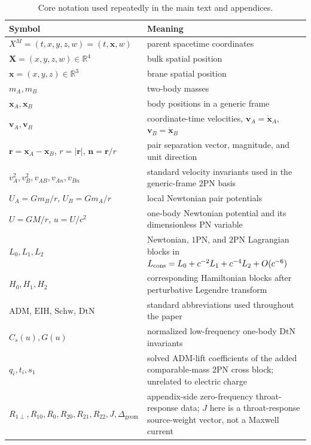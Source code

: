 \documentclass[11pt]{article}
\newcommand{\R}{\mathbb R}
\newcommand{\X}{\mathbf X}
\newcommand{\x}{\mathbf x}
\newcommand{\vct}{\mathbf v}
\newcommand{\nvec}{\mathbf n}
\newcommand{\OnePN}{\mathrm{1PN}}
\newcommand{\TwoPN}{\mathrm{2PN}}
\newcommand{\ADM}{\mathrm{ADM}}
\newcommand{\DtN}{\mathrm{DtN}}
\newcommand{\EIH}{\mathrm{EIH}}
\newcommand{\Schw}{\mathrm{Schw}}
\newcommand{\geom}{\mathrm{geom}}
\begin{document}
\begin{table}[H]
  \centering
  \caption{Core notation used repeatedly in the main text and appendices.}
  \label{tab:notation-core-2pn}
  \small
  \renewcommand{\arraystretch}{1.15}
  \begin{tabularx}{\linewidth}{@{}L L@{}}
    \toprule
    Symbol & Meaning \\
    \midrule
    \(X^M=(t,x,y,z,w)=(t,\x,w)\) & parent spacetime coordinates \\
    \(\X=(x,y,z,w)\in\R^4\) & bulk spatial position \\
    \(\x=(x,y,z)\in\R^3\) & brane spatial position \\
    \(m_A,m_B\) & two-body masses \\
    \(\mathbf x_A,\mathbf x_B\) & body positions in a generic frame \\
    \(\vct_A,\vct_B\) & coordinate-time velocities, \(\vct_A=\dot{\mathbf x}_A\), \(\vct_B=\dot{\mathbf x}_B\) \\
    \(\mathbf r=\mathbf x_A-\mathbf x_B\), \(r=|\mathbf r|\), \(\nvec=\mathbf r/r\) & pair separation vector, magnitude, and unit direction \\
    \(v_A^2, v_B^2, v_{AB}, v_{An}, v_{Bn}\) & standard velocity invariants used in the generic-frame \(\TwoPN\) basis \\
    \(U_A=Gm_B/r\), \(U_B=Gm_A/r\) & local Newtonian pair potentials \\
    \(U=GM/r\), \(u=U/c^2\) & one-body Newtonian potential and its dimensionless PN variable \\
    \(L_0,L_1,L_2\) & Newtonian, \(\OnePN\), and \(\TwoPN\) Lagrangian blocks in
    \(L_{\rm cons}=L_0+c^{-2}L_1+c^{-4}L_2+O(c^{-6})\) \\
    \(H_0,H_1,H_2\) & corresponding Hamiltonian blocks after perturbative Legendre transform \\
    \(\ADM\), \(\EIH\), \(\Schw\), \(\DtN\) & standard abbreviations used throughout the paper \\
    \(C_s(u),G(u)\) & normalized low-frequency one-body \(\DtN\) invariants \\
    \(q_i,t_i,s_1\) & solved \(\ADM\)-lift coefficients of the added comparable-mass \(\TwoPN\) cross block; unrelated to electric charge \\
    \(R_{1\perp},R_{10},R_0,R_{20},R_{21},R_{22},J,\Delta_{\geom}\) & appendix-side zero-frequency throat-response data; \(J\) here is a throat-response source-weight vector, not a Maxwell current \\
    \bottomrule
  \end{tabularx}
\end{table}
\end{document}
